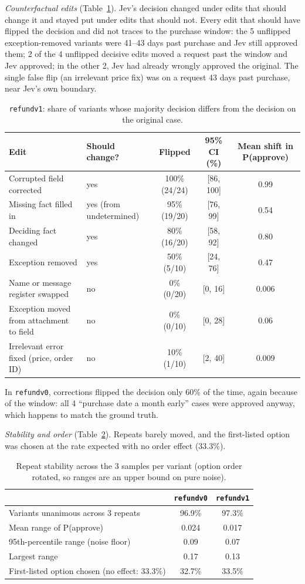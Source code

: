 \documentclass[11pt]{article}
\renewcommand{\_}{\origunderscore\allowbreak}
\begin{document}
\emph{Counterfactual edits} (Table~\ref{tab:e0-flips}). Jev's decision changed under edits that should change it and stayed put under edits that should not. Every edit that should have flipped the decision and did not traces to the purchase window: the 5 unflipped exception-removed variants were 41--43 days past purchase and Jev still approved them; 2 of the 4 unflipped decisive edits moved a request past the window and Jev approved; in the other 2, Jev had already wrongly approved the original. The single false flip (an irrelevant price fix) was on a request 43 days past purchase, near Jev's own boundary.
\begin{table}[H]
\centering\small
\caption{\texttt{refund\_v1}: share of variants whose majority decision differs from the decision on the original case.}
\label{tab:e0-flips}
\begin{tabularx}{\textwidth}{Xlccc}
\toprule
Edit & Should change? & Flipped & 95\% CI (\%) & Mean shift in P(approve) \\
\midrule
Corrupted field corrected & yes & 100\% (24/24) & [86, 100] & 0.99 \\
Missing fact filled in & yes (from undetermined) & 95\% (19/20) & [76, 99] & 0.54 \\
Deciding fact changed & yes & 80\% (16/20) & [58, 92] & 0.80 \\
Exception removed & yes & 50\% (5/10) & [24, 76] & 0.47 \\
Name or message register swapped & no & 0\% (0/20) & [0, 16] & 0.006 \\
Exception moved from attachment to field & no & 0\% (0/10) & [0, 28] & 0.06 \\
Irrelevant error fixed (price, order ID) & no & 10\% (1/10) & [2, 40] & 0.009 \\
\bottomrule
\end{tabularx}
\end{table}
In \texttt{refund\_v0}, corrections flipped the decision only 60\% of the time, again because of the window: all 4 ``purchase date a month early'' cases were approved anyway, which happens to match the ground truth.

\emph{Stability and order} (Table~\ref{tab:e0-noise}). Repeats barely moved, and the first-listed option was chosen at the rate expected with no order effect (33.3\%).
\begin{table}[H]
\centering\small
\caption{Repeat stability across the 3 samples per variant (option order rotated, so ranges are an upper bound on pure noise).}
\label{tab:e0-noise}
\begin{tabular}{lcc}
\toprule
 & \texttt{refund\_v0} & \texttt{refund\_v1} \\
\midrule
Variants unanimous across 3 repeats & 96.9\% & 97.3\% \\
Mean range of P(approve) & 0.024 & 0.017 \\
95th-percentile range (noise floor) & 0.09 & 0.07 \\
Largest range & 0.17 & 0.13 \\
First-listed option chosen (no effect: 33.3\%) & 32.7\% & 33.5\% \\
\bottomrule
\end{tabular}
\end{table}
\end{document}
